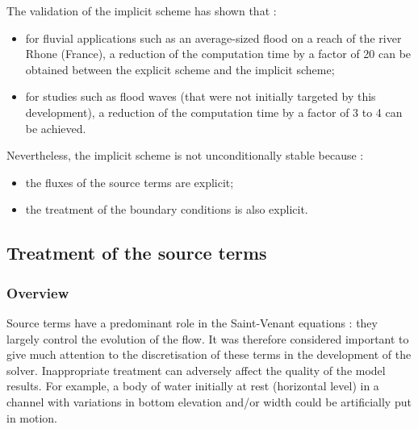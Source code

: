 The validation of the implicit scheme has shown that :
\begin{itemize}
 \item for fluvial applications such as an average-sized flood on a reach of the river Rhone (France), a reduction of the computation time by a factor of 20 can be obtained between the explicit scheme and the implicit scheme;
 \item for studies such as flood waves (that were not initially targeted by this development), a reduction of the computation time by a factor of 3 to 4 can be achieved.
\end{itemize}

Nevertheless, the implicit scheme is not unconditionally stable because :
\begin{itemize}
 \item the fluxes of the source terms are explicit;
 \item the treatment of the boundary conditions is also explicit.
\end{itemize}

\subsection{Treatment of the source terms}
\label{TrtSource}

\subsubsection{Overview}

Source terms have a predominant role in the Saint-Venant equations : they largely control the evolution of the flow. It was therefore considered important to give much attention to the discretisation of these terms in the development of the \mascaret{} solver. Inappropriate treatment can adversely affect the quality of the model results. For example, a body of water initially at rest (horizontal level) in a channel with variations in bottom elevation and/or width could be artificially put in motion.

